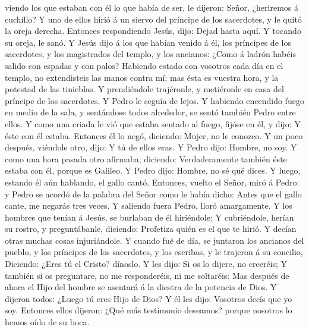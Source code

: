 viendo los que estaban con él lo que había de ser, le dijeron: Señor,
¿heriremos á cuchillo?  Y uno de ellos hirió á un siervo
del príncipe de los sacerdotes, y le quitó la oreja derecha.
 Entonces respondiendo Jesús, dijo: Dejad hasta aquí. Y
tocando su oreja, le sanó.  Y Jesús dijo á los que habían
venido á él, los príncipes de los sacerdotes, y los magistrados del
templo, y los ancianos: ¿Como á ladrón habéis salido con espadas y con
palos?  Habiendo estado con vosotros cada día en el
templo, no extendisteis las manos contra mí; mas ésta es vuestra hora, y
la potestad de las tinieblas.  Y prendiéndole trajéronle,
y metiéronle en casa del príncipe de los sacerdotes. Y Pedro le seguía
de lejos.  Y habiendo encendido fuego en medio de la
sala, y sentándose todos alrededor, se sentó también Pedro entre ellos.
 Y como una criada le vió que estaba sentado al fuego,
fijóse en él, y dijo: Y éste con él estaba.  Entonces él
lo negó, diciendo: Mujer, no le conozco.  Y un poco
después, viéndole otro, dijo: Y tú de ellos eras. Y Pedro dijo: Hombre,
no soy.  Y como una hora pasada otro afirmaba, diciendo:
Verdaderamente también éste estaba con él, porque es Galileo.
 Y Pedro dijo: Hombre, no sé qué dices. Y luego, estando
él aún hablando, el gallo cantó.  Entonces, vuelto el
Señor, miró á Pedro: y Pedro se acordó de la palabra del Señor como le
había dicho: Antes que el gallo cante, me negarás tres veces.
 Y saliendo fuera Pedro, lloró amargamente.
 Y los hombres que tenían á Jesús, se burlaban de él
hiriéndole;  Y cubriéndole, herían su rostro, y
preguntábanle, diciendo: Profetiza quién es el que te hirió.
 Y decían otras muchas cosas injuriándole.
 Y cuando fué de día, se juntaron los ancianos del
pueblo, y los príncipes de los sacerdotes, y los escribas, y le trajeron
á su concilio,  Diciendo: ¿Eres tú el Cristo? dínoslo. Y
les dijo: Si os lo dijere, no creeréis;  Y también si os
preguntare, no me responderéis, ni me soltaréis:  Mas
después de ahora el Hijo del hombre se asentará á la diestra de la
potencia de Dios.  Y dijeron todos: ¿Luego tú eres Hijo
de Dios? Y él les dijo: Vosotros decís que yo soy. 
Entonces ellos dijeron: ¿Qué más testimonio deseamos? porque nosotros lo
hemos oído de su boca.

